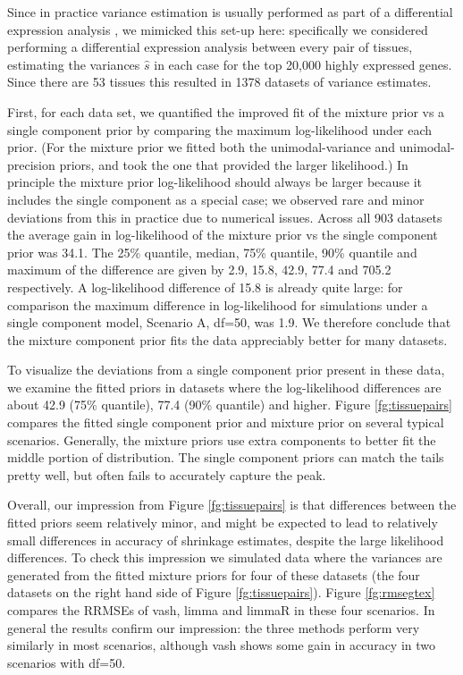 \documentclass{bioinfo}
\begin{document}
 Since in practice variance estimation is usually performed as part of a differential expression analysis \citep{smyth2004limma}, we mimicked
 this set-up here: specifically we considered performing a differential expression analysis between every pair of tissues, estimating the variances 
  $\hat{s}$ in each case for the top 20,000 highly expressed genes. Since there are 53 tissues this resulted in 1378 datasets of variance estimates.

First, for each data set, we quantified the improved fit of the mixture prior vs a single component prior by comparing the maximum log-likelihood under each prior.
(For the mixture prior we fitted both the unimodal-variance and unimodal-precision priors, and took the one that provided the larger likelihood.) 
In principle the mixture prior log-likelihood should always be larger because it includes the single component as a special case; we observed rare and minor deviations from this in practice due to numerical issues. Across all 903 datasets the average gain in log-likelihood of the mixture prior vs the single component prior was 34.1. The 25\% quantile, median, 75\% quantile, 90\% quantile and maximum of the difference are given by 2.9, 15.8, 42.9, 77.4 and 705.2 respectively. 
A log-likelihood difference of 15.8 is already quite large: for comparison
the maximum difference in log-likelihood for simulations under a single component model, Scenario A, df=50, was 1.9.
We therefore conclude that the mixture component prior fits the data
appreciably better for many datasets.

To visualize the deviations from a single component prior present in these data, we examine the fitted priors in datasets where the log-likelihood differences are about 42.9 (75\% quantile), 77.4 (90\% quantile) and higher. Figure \ref{fg:tissuepairs} compares the fitted single component prior and mixture prior on several typical scenarios. Generally, the mixture priors use extra components to better fit the middle portion of distribution. The single component priors can match the tails pretty well, but often fails to accurately capture the peak.

Overall, our impression from Figure \ref{fg:tissuepairs} is that differences between the fitted priors seem relatively minor, and might be expected to lead to relatively
small differences in accuracy of shrinkage estimates, despite the large likelihood differences. To check this impression we simulated  data where the variances are generated from the fitted mixture priors for four of these datasets (the four datasets on the right hand side of Figure \ref{fg:tissuepairs}). Figure \ref{fg:rmsegtex} compares the RRMSEs of vash, limma and limmaR in these four scenarios. In general the results confirm our impression: the three methods perform very similarly in most scenarios, although vash shows
some gain in accuracy in two scenarios with df=50.
\end{document}
